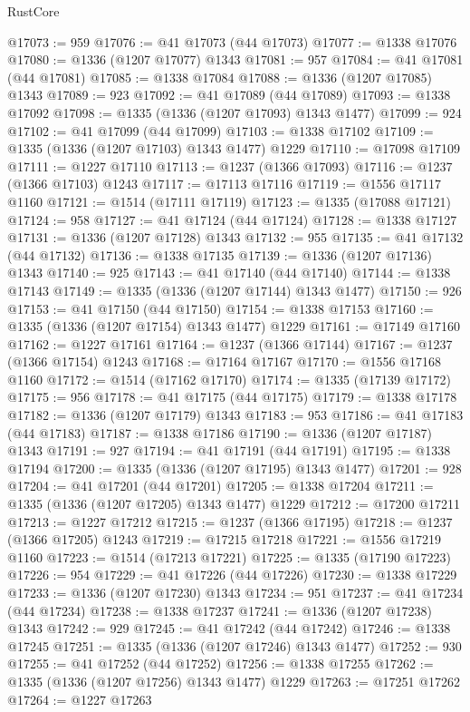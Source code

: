 \begin{lexlean}{RustCore}
\begin{coremodule}
@17073 := 959
@17076 := @41 @17073 (@44 @17073)
@17077 := @1338 @17076
@17080 := @1336 (@1207 @17077) @1343
@17081 := 957
@17084 := @41 @17081 (@44 @17081)
@17085 := @1338 @17084
@17088 := @1336 (@1207 @17085) @1343
@17089 := 923
@17092 := @41 @17089 (@44 @17089)
@17093 := @1338 @17092
@17098 := @1335 (@1336 (@1207 @17093) @1343 @1477)
@17099 := 924
@17102 := @41 @17099 (@44 @17099)
@17103 := @1338 @17102
@17109 := @1335 (@1336 (@1207 @17103) @1343 @1477) @1229
@17110 := @17098 @17109
@17111 := @1227 @17110
@17113 := @1237 (@1366 @17093)
@17116 := @1237 (@1366 @17103) @1243
@17117 := @17113 @17116
@17119 := @1556 @17117 @1160
@17121 := @1514 (@17111 @17119)
@17123 := @1335 (@17088 @17121)
@17124 := 958
@17127 := @41 @17124 (@44 @17124)
@17128 := @1338 @17127
@17131 := @1336 (@1207 @17128) @1343
@17132 := 955
@17135 := @41 @17132 (@44 @17132)
@17136 := @1338 @17135
@17139 := @1336 (@1207 @17136) @1343
@17140 := 925
@17143 := @41 @17140 (@44 @17140)
@17144 := @1338 @17143
@17149 := @1335 (@1336 (@1207 @17144) @1343 @1477)
@17150 := 926
@17153 := @41 @17150 (@44 @17150)
@17154 := @1338 @17153
@17160 := @1335 (@1336 (@1207 @17154) @1343 @1477) @1229
@17161 := @17149 @17160
@17162 := @1227 @17161
@17164 := @1237 (@1366 @17144)
@17167 := @1237 (@1366 @17154) @1243
@17168 := @17164 @17167
@17170 := @1556 @17168 @1160
@17172 := @1514 (@17162 @17170)
@17174 := @1335 (@17139 @17172)
@17175 := 956
@17178 := @41 @17175 (@44 @17175)
@17179 := @1338 @17178
@17182 := @1336 (@1207 @17179) @1343
@17183 := 953
@17186 := @41 @17183 (@44 @17183)
@17187 := @1338 @17186
@17190 := @1336 (@1207 @17187) @1343
@17191 := 927
@17194 := @41 @17191 (@44 @17191)
@17195 := @1338 @17194
@17200 := @1335 (@1336 (@1207 @17195) @1343 @1477)
@17201 := 928
@17204 := @41 @17201 (@44 @17201)
@17205 := @1338 @17204
@17211 := @1335 (@1336 (@1207 @17205) @1343 @1477) @1229
@17212 := @17200 @17211
@17213 := @1227 @17212
@17215 := @1237 (@1366 @17195)
@17218 := @1237 (@1366 @17205) @1243
@17219 := @17215 @17218
@17221 := @1556 @17219 @1160
@17223 := @1514 (@17213 @17221)
@17225 := @1335 (@17190 @17223)
@17226 := 954
@17229 := @41 @17226 (@44 @17226)
@17230 := @1338 @17229
@17233 := @1336 (@1207 @17230) @1343
@17234 := 951
@17237 := @41 @17234 (@44 @17234)
@17238 := @1338 @17237
@17241 := @1336 (@1207 @17238) @1343
@17242 := 929
@17245 := @41 @17242 (@44 @17242)
@17246 := @1338 @17245
@17251 := @1335 (@1336 (@1207 @17246) @1343 @1477)
@17252 := 930
@17255 := @41 @17252 (@44 @17252)
@17256 := @1338 @17255
@17262 := @1335 (@1336 (@1207 @17256) @1343 @1477) @1229
@17263 := @17251 @17262
@17264 := @1227 @17263

\end{coremodule}
\end{lexlean}
